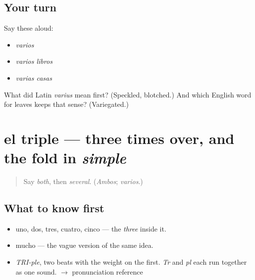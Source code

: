 \subsection*{Your turn}
Say these aloud:

\begin{itemize}
\raggedright
  \item \emph{varios}
  \item \emph{varios libros}
  \item \emph{varias casas}
\end{itemize}

\begin{tcolorbox}[breakable,colback=teal!4,colframe=teal!35!black,title={Before you move on}]
What did Latin \emph{varius} mean first? (Speckled, blotched.) And which English word for leaves keeps that sense? (Variegated.)
\end{tcolorbox}
\section[el triple]{el triple — three times over, and the fold in \emph{simple}}

\label{lesson:ES-C351-triple}



\begin{quote}
Say \emph{both}, then \emph{several}. (\emph{Ambos}; \emph{varios}.)
\end{quote}

\subsection*{What to know first}
\begin{itemize}
\raggedright
  \item uno, dos, tres, cuatro, cinco — the \emph{three} inside it.
  \item mucho — the vague version of the same idea.
\end{itemize}

\begin{sounds}
\begin{itemize}
\raggedright
  \item \emph{TRI-ple}, two beats with the weight on the first. \emph{Tr} and \emph{pl} each run together as one sound. $\to$ pronunciation reference
\end{itemize}
\end{sounds}

